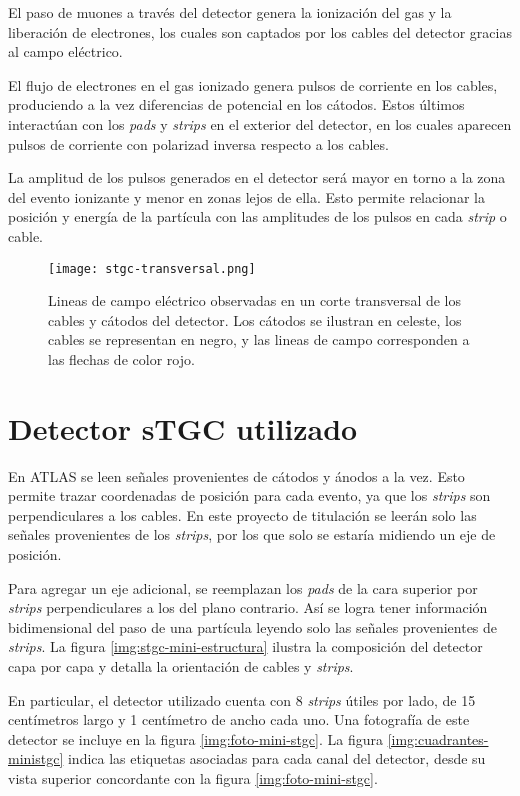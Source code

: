 	El paso de muones a través del detector genera la ionización del gas y la liberación de electrones, los cuales son captados por los cables del detector gracias al campo eléctrico.
	
	El flujo de electrones en el gas ionizado genera pulsos de corriente en los cables, produciendo a la vez diferencias de potencial en los cátodos. Estos últimos interactúan con los \textit{pads} y \textit{strips} en el exterior del detector, en los cuales aparecen pulsos de corriente con polarizad inversa respecto a los cables.
	
	La amplitud de los pulsos generados en el detector será mayor en torno a la zona del evento ionizante y menor en zonas lejos de ella. Esto permite relacionar la posición y energía de la partícula con las amplitudes de los pulsos en cada \textit{strip} o cable.
	
	\begin{figure}[h]
		\centering
		\texttt{[image: stgc-transversal.png]}
		\caption{Lineas de campo eléctrico observadas en un corte transversal de los cables y cátodos del detector. Los cátodos se ilustran en celeste, los cables se representan en negro, y las lineas de campo corresponden a las flechas de color rojo\cite{DeSmet2011StudyLab}.}
		\label{img:stgc-field}
	\end{figure}

\newpage
\section{Detector sTGC utilizado}
	En ATLAS se leen señales provenientes de cátodos y ánodos a la vez. Esto permite trazar coordenadas de posición para cada evento, ya que los \textit{strips} son perpendiculares a los cables. En este proyecto de titulación se leerán solo las señales provenientes de los \textit{strips}, por los que solo se estaría midiendo un eje de posición. 
	
	Para agregar un eje adicional, se reemplazan los \textit{pads} de la cara superior por \textit{strips} perpendiculares a los del plano contrario. Así se logra tener información bidimensional del paso de una partícula leyendo solo las señales provenientes de \textit{strips}. La figura \ref{img:stgc-mini-estructura} ilustra la composición del detector capa por capa y detalla la orientación de cables y \textit{strips}.
	
	En particular, el detector utilizado cuenta con 8 \textit{strips} útiles por lado, de 15 centímetros largo y 1 centímetro de ancho cada uno. Una fotografía de este detector se incluye en la figura \ref{img:foto-mini-stgc}. La figura \ref{img:cuadrantes-ministgc} indica las etiquetas asociadas para cada canal del detector, desde su vista superior concordante con la figura \ref{img:foto-mini-stgc}.
	
